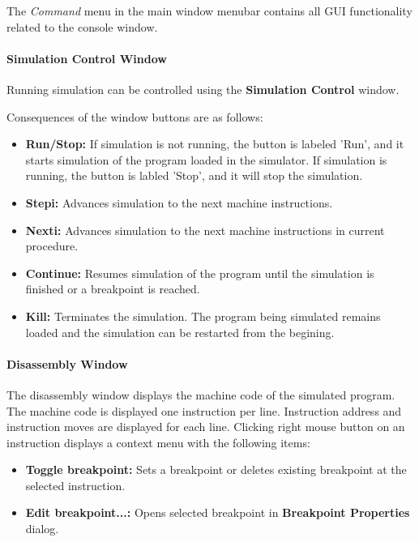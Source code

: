 \documentclass[a4paper,twoside]{tceusermanual}
\begin{document}
The \emph{Command} menu in the main window menubar contains all GUI
functionality related to the console window.


\paragraph{Simulation Control Window}

Running simulation can be controlled using the \textbf{Simulation Control}
window.

Consequences of the window buttons are as follows:
\begin{itemize}
\item \textbf{Run/Stop:} If simulation is not running, the button is
labeled 'Run', and it starts simulation of the program loaded in the
simulator. If simulation is running, the button is labled 'Stop', and
it will stop the simulation.

\item \textbf{Stepi:} Advances simulation to the next machine instructions.

\item \textbf{Nexti:} Advances simulation to the next machine instructions
in current procedure.

\item \textbf{Continue:} Resumes simulation of the program until the
simulation is finished or a breakpoint is reached.
\item \textbf{Kill:} Terminates the simulation. The program being simulated
remains loaded and the simulation can be restarted from the begining.
\end{itemize}


\paragraph{Disassembly Window}
\label{sec:mcode_win}


The disassembly window displays the
machine code of the simulated program. The machine code is displayed
one instruction per line. Instruction address and instruction
moves are displayed for each line.
Clicking right mouse button on an instruction displays a context menu with the
following items:
\begin{itemize}
\item \textbf{Toggle breakpoint:} Sets a breakpoint or deletes existing 
breakpoint at the selected instruction.
\item \textbf{Edit breakpoint...:} Opens selected breakpoint in
\textbf{Breakpoint Properties} dialog.

\end{itemize}
\end{document}
